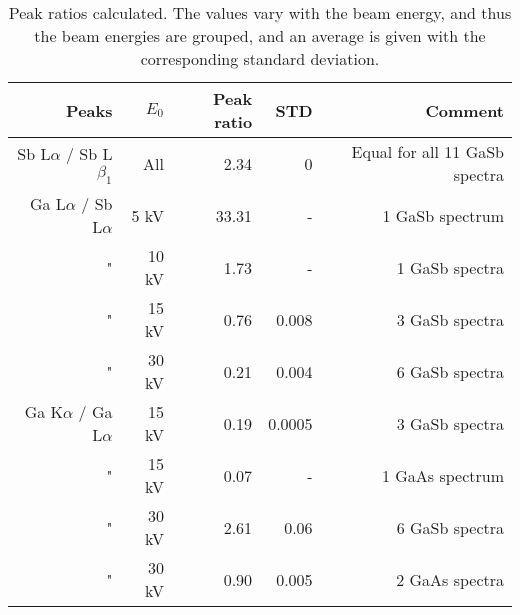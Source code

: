 \begin{table}[phtb]
    \begin{center}
        \caption{
            Peak ratios calculated.
            The values vary with the beam energy, and thus the beam energies are grouped, and an average is given with the corresponding standard deviation.
        }
        \renewcommand*{\arraystretch}{1.4}
        \label{tab:results:peak_ratios}
        \begin{tabular}{rrrrr}
            \hline
            \textbf{Peaks}               & \textbf{$E_0$} & \textbf{Peak ratio} & \textbf{STD} & \textbf{Comment}              \\
            \hline
            Sb L$\alpha$ / Sb L$\beta_1$ & All            & 2.34                & 0            & Equal for all 11 GaSb spectra \\
            Ga L$\alpha$ / Sb L$\alpha$  & 5 kV           & 33.31               & -            & 1 GaSb spectrum               \\
            "                            & 10 kV          & 1.73                & -            & 1 GaSb spectra                \\
            "                            & 15 kV          & 0.76                & 0.008        & 3 GaSb spectra                \\
            "                            & 30 kV          & 0.21                & 0.004        & 6 GaSb spectra                \\
            Ga K$\alpha$ / Ga L$\alpha$  & 15 kV          & 0.19                & 0.0005       & 3 GaSb spectra                \\
            "                            & 15 kV          & 0.07                & -            & 1 GaAs spectrum               \\
            "                            & 30 kV          & 2.61                & 0.06         & 6 GaSb spectra                \\
            "                            & 30 kV          & 0.90                & 0.005        & 2 GaAs spectra                \\
            \hline
        \end{tabular}
    \end{center}
\end{table}
